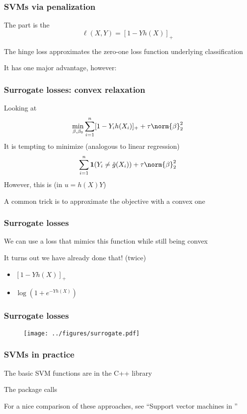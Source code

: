 \documentclass[12pt]{beamer}
\begin{document}
\begin{frame}
\frametitle{SVMs via penalization}
The  part is the 
\[
\ell(X,Y) = [ 1 - Y h(X)]_+
\]

The hinge loss approximates the zero-one loss function underlying
classification

\vsp
It has one major advantage, however: 
\end{frame}
\begin{frame}
\frametitle{Surrogate losses: convex relaxation}
Looking at
\[
\min_{\beta,\beta_0} \sum_{i=1}^n [ 1 - Y_i h(X_i)]_+ + \tau\norm{\beta}_2^2 
\]
It is tempting to minimize (analogous to linear regression)
\[
\sum_{i=1}^n \mathbf{1}(Y_i \neq \hat{g}(X_i)) + \tau\norm{\beta}_2^2 
\]
However, this is  (in $u = h(X)Y$)

\vvsp
A common trick is to approximate the  objective with a convex one

\end{frame}

\begin{frame}
\frametitle{Surrogate losses}

 We can use a  loss that mimics this function while still being
convex

\vsp
It turns out we have already done that! (twice)
\begin{itemize}
\item  {} $[ 1 - Y h(X)]_+$
\item  {} $\log(1 + e^{-Y h(X)})$
\end{itemize}
\end{frame}

\begin{frame}
\frametitle{Surrogate losses}
\begin{figure}
\centering
\texttt{[image: ../figures/surrogate.pdf]}
\end{figure}
\end{frame}

\begin{frame}
\frametitle{SVMs in practice}
 The basic SVM functions are in the C++ library  
\vsp

 The  package  calls  
\vsp

 
\vsp

For a nice comparison of these approaches, see ``Support vector machines in ''

\end{frame}
\end{document}
